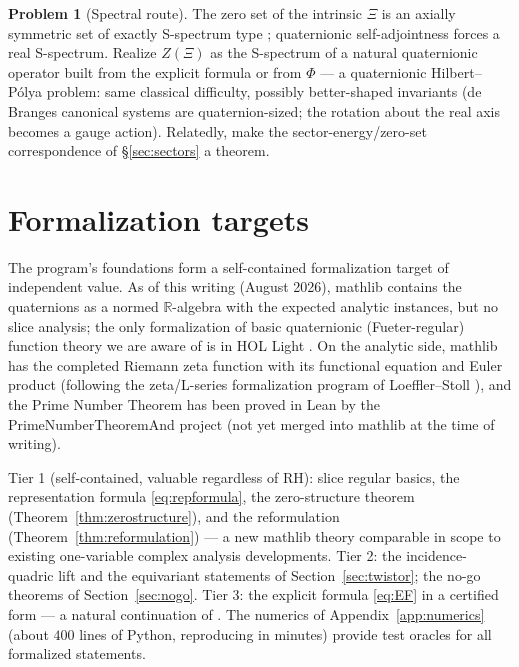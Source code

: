 \documentclass[11pt]{amsart}
\theoremstyle{plain}
\theoremstyle{definition}
\newtheorem{problem}[theorem]{Problem}
\theoremstyle{remark}
\newcommand{\RR}{\mathbb{R}}
\begin{document}
\begin{problem}[Spectral route]\label{prob:spectral}
The zero set of the intrinsic $\Xi$ is an axially symmetric set of exactly S-spectrum type
\cite{CSS2008,ColomboSabadiniStruppa2011}; quaternionic self-adjointness forces a real
S-spectrum. Realize $Z(\Xi)$ as the S-spectrum of a natural quaternionic operator built from the
explicit formula or from $\Phi$ --- a quaternionic Hilbert--P\'olya problem: same classical
difficulty, possibly better-shaped invariants (de Branges canonical systems are
quaternion-sized; the rotation about the real axis becomes a gauge action). Relatedly, make the
sector-energy/zero-set correspondence of \S\ref{sec:sectors} a theorem.
\end{problem}

\section{Formalization targets}\label{sec:formalization}

The program's foundations form a self-contained formalization target of independent value. As of
this writing (August 2026), mathlib \cite{mathlib} contains the quaternions as a normed
$\RR$-algebra with the expected analytic instances, but no slice analysis; the only formalization
of basic quaternionic (Fueter-regular) function theory we are aware of is in HOL Light
\cite{GabrielliMaggesi2017}. On the analytic side, mathlib has the completed Riemann zeta
function with its functional equation and Euler product (following the zeta/L-series
formalization program of Loeffler--Stoll \cite{LoefflerStoll2025}), and the Prime Number Theorem
has been proved in Lean by the PrimeNumberTheoremAnd project \cite{PNTand} (not yet merged into
mathlib at the time of writing).

Tier 1 (self-contained, valuable regardless of RH): slice regular basics, the representation
formula \eqref{eq:repformula}, the zero-structure theorem (Theorem~\ref{thm:zerostructure}), and
the reformulation (Theorem~\ref{thm:reformulation}) --- a new mathlib theory comparable in scope
to existing one-variable complex analysis developments. Tier 2: the incidence-quadric lift and
the equivariant statements of Section~\ref{sec:twistor}; the no-go theorems of
Section~\ref{sec:nogo}. Tier 3: the explicit formula \eqref{eq:EF} in a certified form ---
a natural continuation of \cite{LoefflerStoll2025,PNTand}. The numerics of
Appendix~\ref{app:numerics} (about $400$ lines of Python, reproducing in minutes) provide test
oracles for all formalized statements.
\end{document}

